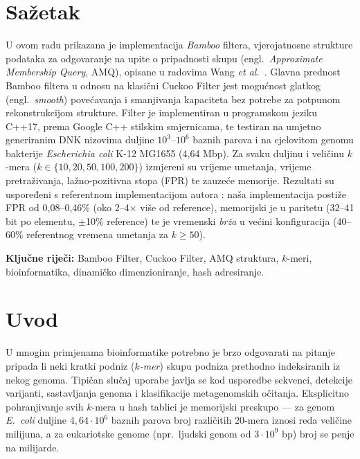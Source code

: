 \documentclass[12pt,a4paper]{article}
\begin{document}
\section*{Sažetak}
U ovom radu prikazana je implementacija \textit{Bamboo} filtera, vjerojatnosne strukture
podataka za odgovaranje na upite o pripadnosti skupu (engl.~\textit{Approximate
Membership Query}, AMQ), opisane u radovima Wang \textit{et al.}~\cite{wang2022bamboo,
wang2024bamboo}. Glavna prednost Bamboo filtera u odnosu na klasični Cuckoo Filter
\cite{fan2014cuckoo} jest mogućnost glatkog (engl.~\textit{smooth}) povećavanja i
smanjivanja kapaciteta bez potrebe za potpunom rekonstrukcijom strukture. Filter je
implementiran u programskom jeziku C++17, prema Google C++ stilskim smjernicama, te
testiran na umjetno generiranim DNK nizovima duljine $10^3$--$10^6$ baznih parova i
na cjelovitom genomu bakterije \textit{Escherichia coli} K-12 MG1655 (4{,}64 Mbp). Za
svaku duljinu i veličinu $k$-mera ($k \in \{10, 20, 50, 100, 200\}$) izmjereni su
vrijeme umetanja, vrijeme pretraživanja, lažno-pozitivna stopa (FPR) te zauzeće
memorije. Rezultati su uspoređeni s referentnom implementacijom autora
\cite{wanghanchengchn-repo}: naša implementacija postiže FPR od 0{,}08--0{,}46\%
(oko 2--4$\times$ više od reference), memorijski je u paritetu (32--41 bit po
elementu, $\pm$10\% reference) te je vremenski \emph{brža} u većini konfiguracija
(40--60\% referentnog vremena umetanja za $k \geq 50$).

\vspace{1em}
\noindent\textbf{Ključne riječi:} Bamboo Filter, Cuckoo Filter, AMQ struktura, $k$-meri,
bioinformatika, dinamičko dimenzioniranje, hash adresiranje.

\newpage
\tableofcontents
\newpage
\setcounter{page}{1}

\section{Uvod}

U mnogim primjenama bioinformatike potrebno je brzo odgovarati na pitanje pripada li
neki kratki podniz (\emph{$k$-mer}) skupu podniza prethodno indeksiranih iz nekog
genoma. Tipičan slučaj uporabe javlja se kod usporedbe sekvenci, detekcije varijanti,
sastavljanja genoma i klasifikacije metagenomskih očitanja. Eksplicitno pohranjivanje
svih $k$-mera u hash tablici je memorijski preskupo --- za genom \textit{E.~coli}
duljine $4{,}64 \cdot 10^6$ baznih parova broj različitih $20$-mera iznosi reda
veličine milijuna, a za eukariotske genome (npr.~ljudski genom od $3 \cdot 10^9$ bp)
broj se penje na milijarde.
\end{document}
